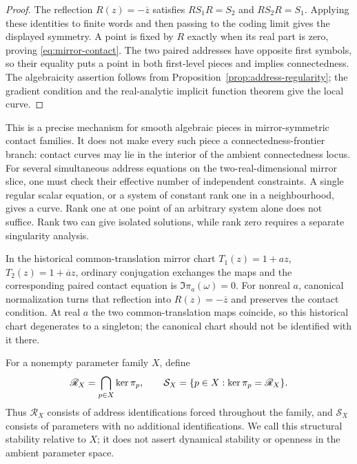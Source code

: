 \begin{proof}
The reflection $R(z)=-\overline z$ satisfies $RS_1R=S_2$ and
$RS_2R=S_1$. Applying these identities to finite words and then
passing to the coding limit gives the displayed symmetry.
A point is fixed by $R$ exactly when its real part is zero, proving
\eqref{eq:mirror-contact}. The two paired addresses have opposite
first symbols, so their equality puts a point in both first-level
pieces and implies connectedness. The algebraicity assertion follows
from Proposition~\ref{prop:address-regularity}; the gradient condition
and the real-analytic implicit function theorem give the local curve.
\end{proof}

This is a precise mechanism for smooth algebraic pieces in
mirror-symmetric contact families. It does not make every such
piece a connectedness-frontier branch: contact curves may lie in
the interior of the ambient connectedness locus. For several
simultaneous address equations on the two-real-dimensional mirror
slice, one must check their effective number of independent
constraints. A single regular scalar equation, or a system of
constant rank one in a neighbourhood, gives a curve. Rank one at
one point of an arbitrary system alone does not suffice. Rank two
can give isolated solutions, while rank zero requires a separate
singularity analysis.

In the historical common-translation mirror chart
$T_1(z)=1+az$, $T_2(z)=1+\overline a z$, ordinary conjugation exchanges
the maps and the corresponding paired contact equation is
$\Im\pi_a(\omega)=0$. For nonreal $a$, canonical normalization
turns that reflection into $R(z)=-\overline z$ and preserves the
contact condition. At real $a$ the two common-translation maps
coincide, so this historical chart degenerates to a singleton;
the canonical chart should not be identified with it there.

\begin{definition}
For a nonempty parameter family $X$, define
\[
\mathscr R_X=\bigcap_{p\in X}\operatorname{ker}\pi_p,
\qquad
\mathcal S_X=\{p\in X:\operatorname{ker}\pi_p=\mathscr R_X\}.
\]
Thus $\mathscr R_X$ consists of address identifications forced
throughout the family, and $\mathcal S_X$ consists of parameters
with no additional identifications. We call this structural
stability relative to $X$; it does not assert dynamical stability
or openness in the ambient parameter space.
\end{definition}

